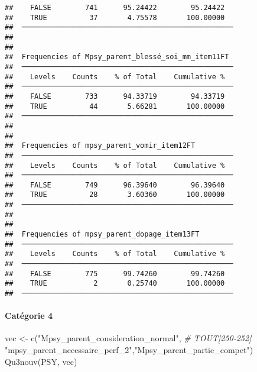 \documentclass[
]{article}
\newenvironment{Shaded}{\begin{snugshade}}{\end{snugshade}}
\newcommand{\CommentTok}[1]{\textcolor[rgb]{0.56,0.35,0.01}{\textit{#1}}}
\newcommand{\FunctionTok}[1]{\textcolor[rgb]{0.00,0.00,0.00}{#1}}
\newcommand{\NormalTok}[1]{#1}
\newcommand{\OtherTok}[1]{\textcolor[rgb]{0.56,0.35,0.01}{#1}}
\newcommand{\StringTok}[1]{\textcolor[rgb]{0.31,0.60,0.02}{#1}}
\begin{document}
\begin{verbatim}
##    FALSE        741      95.24422        95.24422   
##    TRUE          37       4.75578       100.00000   
##  ────────────────────────────────────────────────── 
## 
## 
##  Frequencies of Mpsy_parent_blessé_soi_mm_item11FT  
##  ────────────────────────────────────────────────── 
##    Levels    Counts    % of Total    Cumulative %   
##  ────────────────────────────────────────────────── 
##    FALSE        733      94.33719        94.33719   
##    TRUE          44       5.66281       100.00000   
##  ────────────────────────────────────────────────── 
## 
## 
##  Frequencies of mpsy_parent_vomir_item12FT          
##  ────────────────────────────────────────────────── 
##    Levels    Counts    % of Total    Cumulative %   
##  ────────────────────────────────────────────────── 
##    FALSE        749      96.39640        96.39640   
##    TRUE          28       3.60360       100.00000   
##  ────────────────────────────────────────────────── 
## 
## 
##  Frequencies of mpsy_parent_dopage_item13FT         
##  ────────────────────────────────────────────────── 
##    Levels    Counts    % of Total    Cumulative %   
##  ────────────────────────────────────────────────── 
##    FALSE        775      99.74260        99.74260   
##    TRUE           2       0.25740       100.00000   
##  ──────────────────────────────────────────────────
\end{verbatim}

\hypertarget{catuxe9gorie-4-2}{%
\paragraph{Catégorie 4}\label{catuxe9gorie-4-2}}

\begin{Shaded}
\begin{Highlighting}[]
\NormalTok{vec }\OtherTok{\textless{}{-}} \FunctionTok{c}\NormalTok{(}\StringTok{"Mpsy\_parent\_consideration\_normal"}\NormalTok{,   }\CommentTok{\# TOUT[250{-}252]}
         \StringTok{"mpsy\_parent\_necessaire\_perf\_2"}\NormalTok{,}\StringTok{"Mpsy\_parent\_partie\_compet"}\NormalTok{)}
\FunctionTok{Qu3nouv}\NormalTok{(PSY, vec)}
\end{Highlighting}
\end{Shaded}
\end{document}
